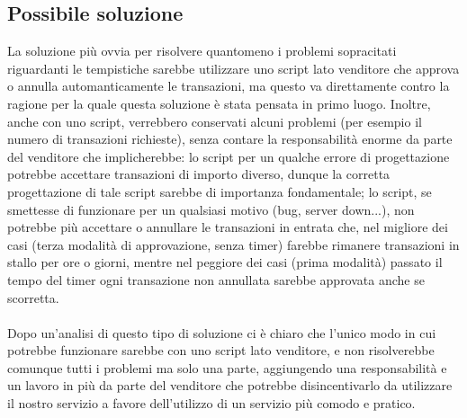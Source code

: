\documentclass[a4paper, 12pt]{article}
\begin{document}
\subsection*{Possibile soluzione}
La soluzione più ovvia per risolvere quantomeno i problemi sopracitati riguardanti le tempistiche sarebbe utilizzare uno script lato venditore che approva o annulla automanticamente le transazioni, ma questo va direttamente contro la ragione per la quale questa soluzione è stata pensata in primo luogo. Inoltre, anche con uno script, verrebbero conservati alcuni problemi (per esempio il numero di transazioni richieste), senza contare la responsabilità enorme da parte del venditore che implicherebbe: lo script per un qualche errore di progettazione potrebbe accettare transazioni di importo diverso, dunque la corretta progettazione di tale script sarebbe di importanza fondamentale; lo script, se smettesse di funzionare per un qualsiasi motivo (bug, server down...), non potrebbe più accettare o annullare le transazioni in entrata che, nel migliore dei casi (terza modalità di approvazione, senza timer) farebbe rimanere transazioni in stallo per ore o giorni, mentre nel peggiore dei casi (prima modalità) passato il tempo del timer ogni transazione non annullata sarebbe approvata anche se scorretta.
\\\\Dopo un'analisi di questo tipo di soluzione ci è chiaro che l'unico modo in cui potrebbe funzionare sarebbe con uno script lato venditore, e non risolverebbe comunque tutti i problemi ma solo una parte, aggiungendo una responsabilità e un lavoro in più da parte del venditore che potrebbe disincentivarlo da utilizzare il nostro servizio a favore dell'utilizzo di un servizio più comodo e pratico.

\newpage
\end{document}
